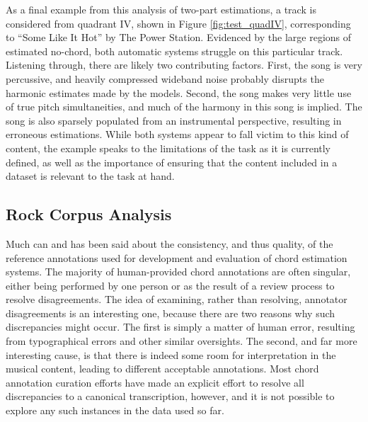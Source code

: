 As a final example from this analysis of two-part estimations, a track is considered from quadrant IV, shown in Figure \ref{fig:test_quadIV}, corresponding to ``Some Like It Hot'' by The Power Station.
Evidenced by the large regions of estimated no-chord, both automatic systems struggle on this particular track.
Listening through, there are likely two contributing factors.
First, the song is very percussive, and heavily compressed wideband noise probably disrupts the harmonic estimates made by the models.
Second, the song makes very little use of true pitch simultaneities, and much of the harmony in this song is implied.
The song is also sparsely populated from an instrumental perspective, resulting in erroneous estimations.
While both systems appear to fall victim to this kind of content, the example speaks to the limitations of the task as it is currently defined, as well as the importance of ensuring that the content included in a dataset is relevant to the task at hand.


\subsection{Rock Corpus Analysis}
\label{subsec:qualitative_analysis}

Much can and has been said about the consistency, and thus quality, of the reference annotations used for development and evaluation of chord estimation systems.
The majority of human-provided chord annotations are often singular, either being performed by one person or as the result of a review process to resolve disagreements.
The idea of examining, rather than resolving, annotator disagreements is an interesting one, because there are two reasons why such discrepancies might occur.
The first is simply a matter of human error, resulting from typographical errors and other similar oversights.
The second, and far more interesting cause, is that there is indeed some room for interpretation in the musical content, leading to different acceptable annotations.
Most chord annotation curation efforts have made an explicit effort to resolve all discrepancies to a canonical transcription, however, and it is not possible to explore any such instances in the data used so far.




